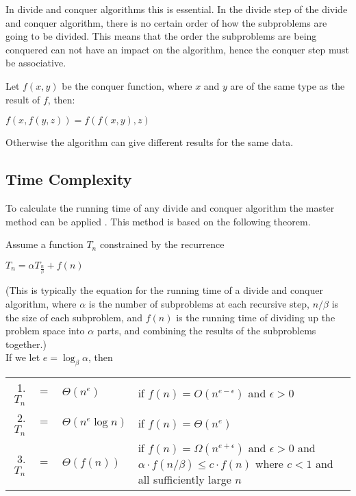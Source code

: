 In divide and conquer algorithms this is essential. In the divide step of the
divide and conquer algorithm, there is no certain order of how the subproblems
are going to be divided. This means that the order the subproblems are being
conquered can not have an impact on the algorithm, hence the conquer step must be
associative.

\begin{example}\label{assprop}
Let $f(x,y)$ be the conquer function, where $x$ and $y$ are of the same type as
the result of $f$, then:
\begin{center}
$f(x,f(y,z)) = f(f(x,y),z)$
\end{center}
Otherwise the algorithm can give different results for the same data.
\end{example}

\subsection{Time Complexity}
To calculate the running time of any divide and conquer algorithm the master
method can be applied \cite{Cormen}. This method is based on the following
theorem.
\begin{theorem} $ $\\
Assume a function $T_n$ constrained by the recurrence
\begin{center}
$T_n = {\alpha}T_{\frac{n}{\beta}}+ f(n)$
\end{center}
(This is typically the equation for the running time of a divide and conquer
algorithm, where $\alpha$ is the number of subproblems at each recursive step,
$n/\beta$ is the size of each subproblem, and $f(n)$ is the running time of
dividing up the problem space into $\alpha$ parts, and combining the results
of the subproblems together.)\\
If we let $e = \log_\beta \alpha$, then
\begin{center}
\begin{tabular}{r c l l}
1. $T_n$ & $=$ & $\Theta(n^{e})$ &  if $f(n) = O(n^{e - \epsilon})$ and $\epsilon > 0$\\
2. $T_n$ & $=$ & $\Theta(n^{e} \log n)$ & if $f(n) = \Theta(n^e)$\\
3. $T_n$ & $=$ & $\Theta(f(n))$ & \begin{minipage}[t]{0.6 \columnwidth}
  if $f(n) = \Omega(n^{e+\epsilon})$ and $\epsilon > 0$
  and $\alpha \cdot f(n/\beta) \leq c \cdot f(n)$
  where $c < 1$ and all sufficiently large $n$
  \end{minipage}
\end{tabular}
\end{center}
\qeda
\end{theorem}

